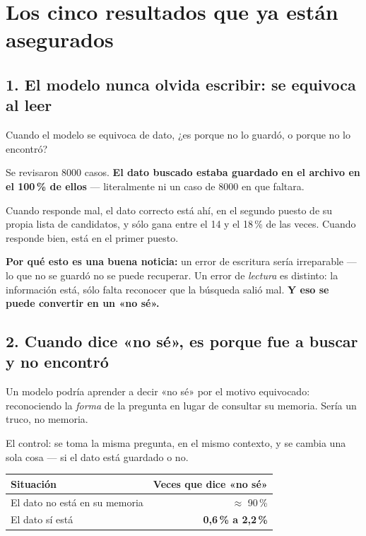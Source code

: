 \documentclass[11pt,a4paper]{article}
\begin{document}
\section{Los cinco resultados que ya están asegurados}

\subsection{1. El modelo nunca olvida escribir: se equivoca al leer}

Cuando el modelo se equivoca de dato, ¿es porque no lo guardó, o porque no lo encontró?

Se revisaron 8000 casos. \textbf{El dato buscado estaba guardado en el archivo en el 100\,\% de
ellos} --- literalmente ni un caso de 8000 en que faltara.

Cuando responde mal, el dato correcto está ahí, en el segundo puesto de su propia lista de
candidatos, y sólo gana entre el 14 y el 18\,\% de las veces. Cuando responde bien, está en el
primer puesto.

\begin{caja}
\textbf{Por qué esto es una buena noticia:} un error de escritura sería irreparable --- lo que no
se guardó no se puede recuperar. Un error de \emph{lectura} es distinto: la información está,
sólo falta reconocer que la búsqueda salió mal. \textbf{Y eso se puede convertir en un «no sé».}
\end{caja}

\subsection{2. Cuando dice «no sé», es porque fue a buscar y no encontró}

Un modelo podría aprender a decir «no sé» por el motivo equivocado: reconociendo la \emph{forma}
de la pregunta en lugar de consultar su memoria. Sería un truco, no memoria.

El control: se toma la misma pregunta, en el mismo contexto, y se cambia una sola cosa --- si el
dato está guardado o no.

\begin{center}
\begin{tabular}{lr}
\toprule
\textbf{Situación} & \textbf{Veces que dice «no sé»} \\
\midrule
El dato no está en su memoria & $\approx$ 90\,\% \\
El dato sí está & \textbf{0,6\,\% a 2,2\,\%} \\
\bottomrule
\end{tabular}
\end{center}
\end{document}
